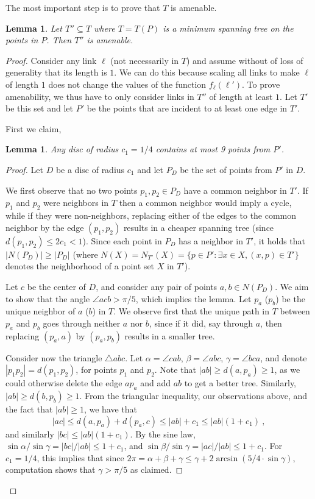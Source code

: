 \documentclass[11pt]{amsart}
\newcounter{foo}
\newtheorem{lemma}[foo]{Lemma}
\begin{document}
The most important step is to prove that $T$ is amenable.
\begin{lemma}
Let $T'' \subseteq T$ where $T = T(P)$ is a minimum spanning tree on the points in $P$. Then $T''$ is amenable.
\label{lem:approx}
\end{lemma}
\begin{proof}
Consider any link $\ell$ (not necessarily in $T$) and assume without of loss of generality that its length is $1$. 
We can do this because scaling all links to make $\ell$ of length $1$ does not change the values of the function 
$f_{\ell}(\ell')$.
To prove
amenability, we thus have to only consider links in $T''$ of length at least $1$. Let $T'$ be this set and let $P'$ be the points that are incident to at least one edge in $T'$.

First we claim,
\begin{lemma}
Any disc of radius $c_1 = 1/4$ contains at most 9 points from $P'$. 
\label{pointsincircle}
\end{lemma}
\begin{proof}
Let $D$ be a disc of radius $c_1$ and 
let $P_D$ be the set of points from $P'$ in $D$.  


We first observe that no two points $p_1, p_2 \in P_D$ have a common
neighbor in $T'$.
If $p_1$ and $p_2$ were neighbors in $T$ then a common neighbor would imply a cycle, while if they were non-neighbors,
replacing either of the edges to the common neighbor by the edge $(p_1, p_2)$ 
results in a cheaper spanning tree (since $d(p_1, p_2) \leq 2 c_1 < 1$).
Since each point in $P_D$ has a neighbor in $T'$, it holds that $|N(P_D)| \geq |P_D|$ (where $N(X) = N_{T'}(X) = \{p \in P' : \exists x \in X, (x,p) \in T'\}$ 
denotes the neighborhood of a point set $X$ in $T'$).

Let $c$ be the center of $D$, and consider any pair of points $a, b \in N(P_D)$. 
We aim to show that the angle $\angle a c b > \pi/5$, which implies the lemma.
Let $p_a$ ($p_b$) be the unique neighbor of $a$ ($b$) in $T$.
We observe first that the unique path in $T$ between $p_a$
and $p_b$ goes through neither $a$ nor $b$, since if it did, say
through $a$, then replacing $(p_a, a)$ by $(p_a, p_b)$ results in a 
smaller tree.  

Consider now the triangle $\triangle a b c$.  Let $\alpha = \angle c a b$, 
$\beta = \angle a b c$, $\gamma = \angle b c a$, and denote
$|p_1 p_2| = d(p_1, p_2)$, for points $p_1$ and $p_2$.
Note that $|ab| \ge d(a, p_a) \ge 1$, as
we could otherwise delete the edge $ap_a$ and add $ab$ to get a
better tree. Similarly, $|ab|\ge d(b, p_b) \ge 1$.
From the triangular inequality, our observations above, and the
fact that $|ab| \ge 1$, we have that
\[ |ac| \le d(a,p_a) + d(p_a,c) \le |ab| + c_1 \le |ab| (1 + c_1)\ , \]
and similarly $|bc| \le {|ab|} (1 + c_1)$.
By the sine law, $\sin \alpha / \sin \gamma = |bc|/|ab| \le 1 + c_1$,
and $\sin \beta / \sin \gamma = |ac|/|ab| \le 1 + c_1$.
For $c_1 = 1/4$, this implies that since $2\pi = \alpha + \beta + \gamma 
\le \gamma + 2 \arcsin(5/4 \cdot \sin \gamma)$, computation shows that $\gamma > \pi/5$ as claimed.
\end{proof}


\end{proof}
\end{document}
